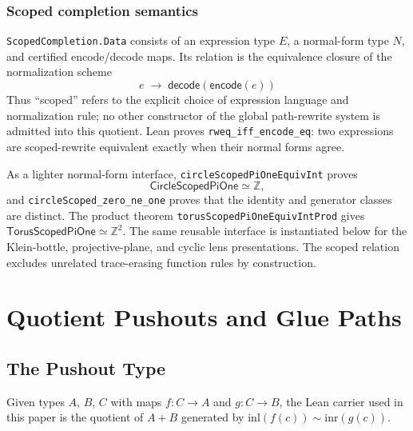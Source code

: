 \documentclass{lmcs}
\theoremstyle{definition}
\theoremstyle{plain}
\theoremstyle{remark}
\newcommand{\Pushout}{\mathrm{Pushout}}
\newcommand{\inl}{\mathrm{inl}}
\newcommand{\inr}{\mathrm{inr}}
\newcommand{\ZZ}{\mathbb{Z}}
\begin{document}
\subsubsection*{Scoped completion semantics}

\texttt{ScopedCompletion.Data} consists of an expression type \(E\), a
normal-form type \(N\), and certified encode/decode maps.  Its relation is the
equivalence closure of the normalization scheme
\[
e \;\longrightarrow\; \mathsf{decode}(\mathsf{encode}(e))
\]
Thus ``scoped'' refers to the explicit choice of expression language and
normalization rule; no other constructor of the global path-rewrite system is
admitted into this quotient.  Lean proves
\texttt{rweq\_iff\_encode\_eq}: two expressions are scoped-rewrite equivalent
exactly when their normal forms agree.

As a lighter normal-form interface, \texttt{circleScopedPiOneEquivInt} proves
\[
\mathsf{CircleScopedPiOne}\simeq\ZZ,
\]
and \texttt{circleScoped\_zero\_ne\_one} proves that the identity and generator
classes are distinct.  The product theorem
\texttt{torusScopedPiOneEquivIntProd} gives
\(\mathsf{TorusScopedPiOne}\simeq\ZZ^2\).  The same reusable interface is
instantiated below for the Klein-bottle, projective-plane, and cyclic lens
presentations.  The scoped relation excludes unrelated trace-erasing function
rules by construction.

\section{Quotient Pushouts and Glue Paths}
\label{sec:pushouts}

\subsection{The Pushout Type}

Given types $A$, $B$, $C$ with maps $f : C \to A$ and $g : C \to B$,
the Lean carrier used in this paper is the quotient of \(A+B\) generated by
\(\mathrm{inl}(f(c))\sim\mathrm{inr}(g(c))\).

\begin{center}
\end{center}
\end{document}
